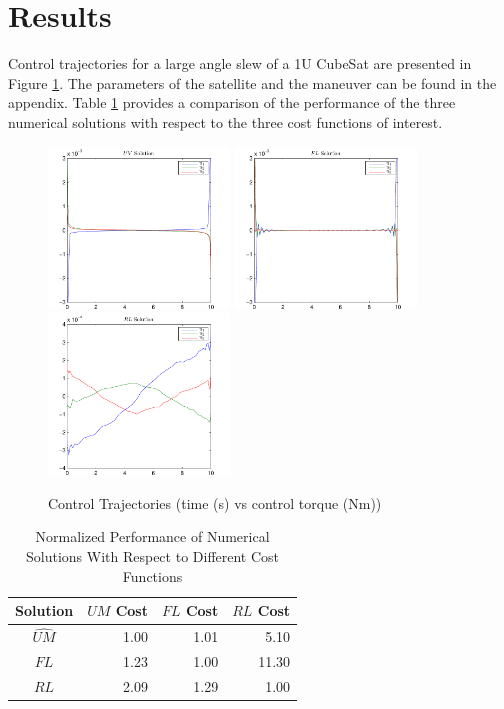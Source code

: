 \documentclass[letterpaper, paper,11pt]{AAS}		%
\begin{document}
\section{Results}
Control trajectories for a large angle slew of a 1U CubeSat are presented in Figure \ref{f:CT}. The parameters of the satellite and the maneuver can be found in the appendix. Table \ref{tab:pcomp} provides a comparison of the performance of the three numerical solutions with respect to the three cost functions of interest.

\begin{figure}[h]
\centering
\includegraphics[width = 1.9in]{u_le}
\includegraphics[width = 1.9in]{u_v2}
\includegraphics[width = 1.9in]{u_u2}
\caption{Control Trajectories (time (s) vs control torque (Nm))}
\label{f:CT}
\end{figure}

\begin{table}[h]

	\fontsize{10}{10}\selectfont

        \centering 
   \begin{tabular}{c | r | r | r } %
      \hline 
      Solution    & $UM$ Cost & $FL$ Cost & $RL$ Cost \\
      \hline 
      $\hat{UM}$      & 1.00 & 1.01 & 5.10 \\
      $FL$       & 1.23 & 1.00 & 11.30 \\
      $RL$      & 2.09  & 1.29 & 1.00 \\    
      \hline
   \end{tabular}
   	       \caption{Normalized Performance of Numerical Solutions With Respect to Different Cost Functions}
	   \label{tab:pcomp}
\end{table}
     
\end{document}
